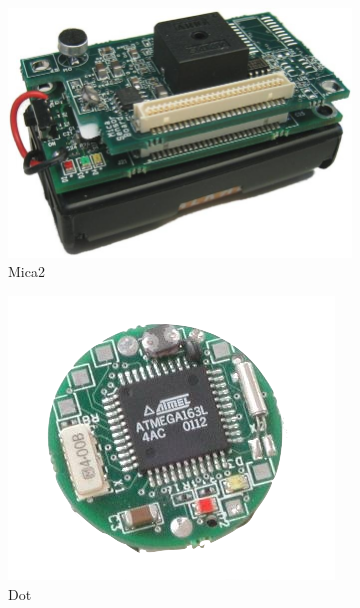 \begin{figure}[ht]
\centering
\begin{subfigure}{.24\textwidth}
  \centering
  \includegraphics[width=.9\linewidth]{./resources/mica2.jpg}
  \caption{Mica2}
  \label{fig:mica2}
\end{subfigure}
\begin{subfigure}{.24\textwidth}
  \centering
  \includegraphics[width=.9\linewidth]{./resources/dot.png}
  \caption{Dot}
  \label{fig:dot}
\end{subfigure}
\begin{subfigure}{.24\textwidth}
  \centering

\end{subfigure}
\end{figure}
